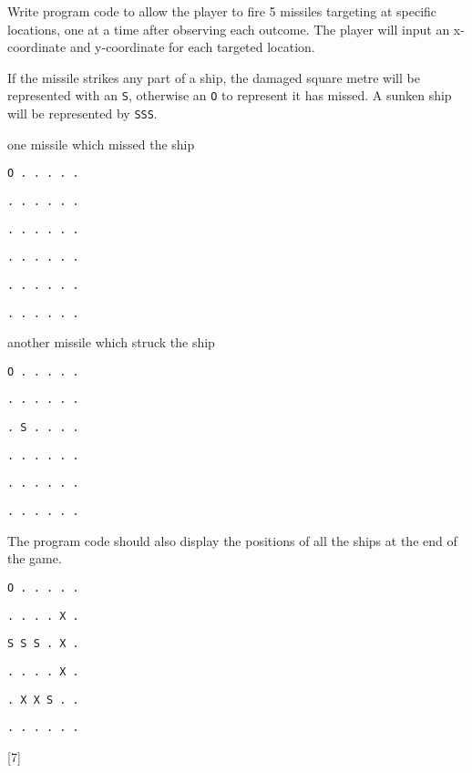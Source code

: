 Write program code to allow the player to fire 5 missiles targeting
at specific locations, one at a time after observing each outcome.
The player will input an x-coordinate and y-coordinate for each targeted
location.

If the missile strikes any part of a ship, the damaged square metre
will be represented with an \textquotedbl\texttt{S}\textquotedbl ,
otherwise an \textquotedbl\texttt{O}\textquotedbl{} to represent
it has missed. A sunken ship will be represented by \textquotedbl\texttt{SSS}\textquotedbl .

\noindent %
\noindent\begin{minipage}[t]{1\columnwidth}%
one missile which missed the ship

\bigskip{}

\texttt{O . . . . .}

\texttt{. . . . . .}

\texttt{. . . . . .}

\texttt{. . . . . .}

\texttt{. . . . . .}

\texttt{. . . . . .}%
\end{minipage}

\noindent %
\noindent\begin{minipage}[t]{1\columnwidth}%
another missile which struck the ship

\bigskip{}

\texttt{O . . . . .}

\texttt{. . . . . .}

\texttt{. S . . . .}

\texttt{. . . . . .}

\texttt{. . . . . .}

\texttt{. . . . . .}%
\end{minipage}

The program code should also display the positions of all the ships
at the end of the game.

\noindent %
\noindent\begin{minipage}[t]{1\columnwidth}%
\texttt{O . . . . . }

\texttt{. . . . X . }

\texttt{S S S . X . }

\texttt{. . . . X . }

\texttt{. X X S . . }

\texttt{. . . . . .}%
\end{minipage}

\hfill{}{[}7{]} 

